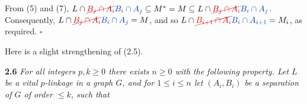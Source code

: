 From (5) and (7), $L \cap \delm{B_j \cap A_i}\fix{B_i \cap A_j} \subseteq M^* = M \subseteq L \cap \delm{B_j \cap A_i}\fix{B_i \cap A_j}$. Consequently, $L \cap \delm{B_j \cap A_i}\fix{B_i \cap A_j} = M$, and so $L \cap \delm{B_{i+1} \cap A_i}\fix{B_i \cap A_{i+1}} = M_i$, as required. $\square$

Here is a slight strengthening of (2.5).

\textbf{2.6} \textit{For all integers $p, k \ge 0$ there exists $n \ge 0$ with the following property. Let $L$ be a vital $p$-linkage in a graph $G$, and for $1 \le i \le n$ let $(A_i, B_i)$ be a separation of $G$ of order $\le k$, such that}
